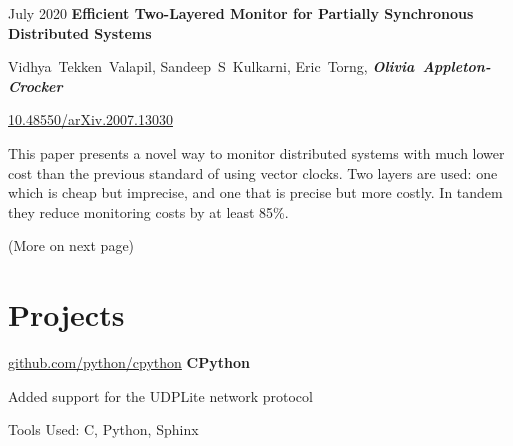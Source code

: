 	\vspace{0.2 cm}

	\begin{samepage}
		\begin{twocolentry}
			{ July 2020 } \textbf{Efficient Two-Layered Monitor for Partially
			Synchronous Distributed Systems}
		\end{twocolentry}

		\vspace{0.10 cm}

		\begin{onecolentry}
			\mbox{Vidhya Tekken Valapil}, \mbox{Sandeep S Kulkarni}, \mbox{Eric Torng},
			\mbox{\textbf{\textit{Olivia Appleton-Crocker}}}

			\vspace{0.10 cm}

			\href{https://doi.org/10.48550/arXiv.2007.13030}{10.48550/arXiv.2007.13030} \vspace{0.1 cm}

			This paper presents a novel way to monitor distributed systems with much lower cost than the previous standard of using vector clocks. Two layers are used: one which is cheap but imprecise, and one that is precise but more costly. In tandem they reduce monitoring costs by at least 85\%.
		\end{onecolentry}
	\end{samepage}

	\vfill

	\begin{center}
		\footnotesize (More on next page) \normalsize
	\end{center}

	\vspace{0.2 cm}
	\newpage

	\section{Projects}

	\begin{samepage}
		\begin{twocolentry}
			{ \href{https://github.com/python/cpython}{github.com/python/cpython} } \textbf{CPython}
		\end{twocolentry}
	
		\begin{onecolentry}
			\begin{highlights}
				\item Added support for the UDPLite network protocol \item Tools Used: C, Python,
				Sphinx
			\end{highlights}
		\end{onecolentry}
	\end{samepage}

